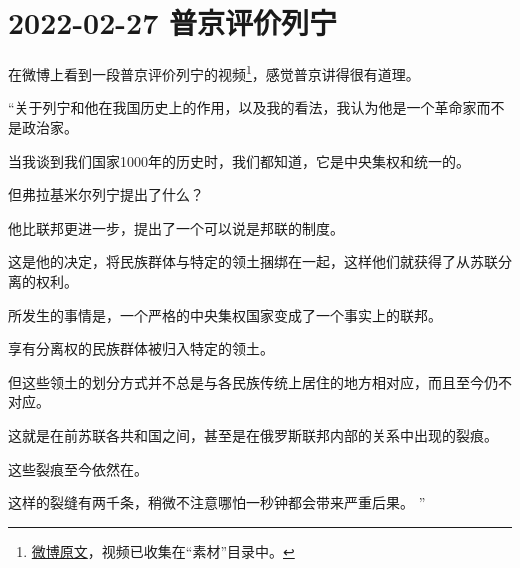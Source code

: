 \section{2022-02-27 普京评价列宁}

在微博上看到一段普京评价列宁的视频\footnote{\href{https://m.weibo.cn/status/4739964812135108}{微博原文}，视频已收集在“素材”目录中。}，感觉普京讲得很有道理。

“关于列宁和他在我国历史上的作用，以及我的看法，我认为他是一个革命家而不是政治家。

当我谈到我们国家1000年的历史时，我们都知道，它是中央集权和统一的。

但弗拉基米尔列宁提出了什么？

他比联邦更进一步，提出了一个可以说是邦联的制度。

这是他的决定，将民族群体与特定的领土捆绑在一起，这样他们就获得了从苏联分离的权利。

所发生的事情是，一个严格的中央集权国家变成了一个事实上的联邦。

享有分离权的民族群体被归入特定的领土。

但这些领土的划分方式并不总是与各民族传统上居住的地方相对应，而且至今仍不对应。

这就是在前苏联各共和国之间，甚至是在俄罗斯联邦内部的关系中出现的裂痕。

这些裂痕至今依然在。

这样的裂缝有两千条，稍微不注意哪怕一秒钟都会带来严重后果。
”

